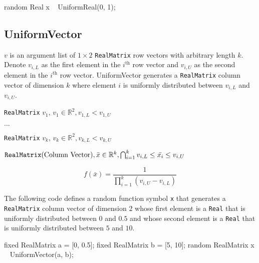 \begin{blogcode}
random Real x ~ UniformReal(0, 1);
\end{blogcode}

\subsection{UniformVector}

$v$ is an argument list of $1 \times 2$ \verb|RealMatrix| row vectors with arbitrary length $k$. Denote $v_{i,L}$ as the first element in the $i^{\text{th}}$ row vector and $v_{i, U}$ as the second element in the $i^{\text{th}}$ row vector. UniformVector generates a \verb|RealMatrix| column vector of dimension $k$ where element $i$ is uniformly distributed between $v_{i,L}$ and $v_{i,U}$.

\begin{itemize*}
\item[] \verb|RealMatrix| $v_{1}$, $v_{1} \in \mathbb{R}^{2}, v_{1,L} < v_{1,U}$
\item[] $\ldots$
\item[] \verb|RealMatrix| $v_{k}$, $v_{k} \in \mathbb{R}^{2},
v_{k,L} < v_{k,U}$

\end{itemize*}

\begin{itemize*}
\item[] $\verb|RealMatrix| \text{(Column Vector)},
\bar{x} \in \mathbb{R}^{k}, \bigcap_{i=1}^{k} v_{i,L} \leq \bar{x_{i}} \leq v_{i,U}  $
\end{itemize*}

\[
	f(\bar{x}) = \frac{1}{\prod_{i=1}^{k} (v_{i,U} - v_{i,L})}
\]

The following code defines a random function symbol \verb|x| that generates a \verb|RealMatrix| column vector of dimension $2$ whose first element is a \verb|Real| that is uniformly distributed between $0$ and $0.5$ and whose second element is a \verb|Real| that is uniformly distributed between $5$ and $10$.

\begin{blogcode}
fixed RealMatrix a = [0, 0.5];
fixed RealMatrix b = [5, 10];
random RealMatrix x ~ UniformVector(a, b);
\end{blogcode}


